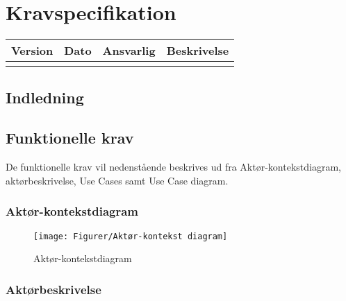 \chapter{Kravspecifikation}

\begin{longtabu} to 
    Version &    Dato &    Ansvarlig &    Beskrivelse\\[-1ex]
    \midrule

\label{version_Systemark}
\end{longtabu}


\section{Indledning}


\section{Funktionelle krav}
De funktionelle krav vil nedenstående beskrives ud fra Aktør-kontekstdiagram, aktørbeskrivelse, Use Cases samt Use Case diagram. 

\subsection{Aktør-kontekstdiagram}
\begin{figure}
	\centering
	\texttt{[image: Figurer/Aktør-kontekst diagram]}
	\caption{Aktør-kontekstdiagram}
	\label{fig:aktoerbeskrivelse}
\end{figure}



\subsection{Aktørbeskrivelse}

